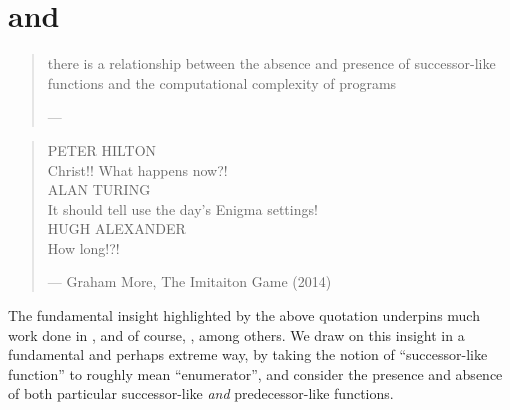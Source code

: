 \chapter{\PTIME{} and \FPTIME{}}

\begin{quotation}

\footnotesize\sffamily\itshape

\begin{flushright}

there is a relationship between the absence and presence of successor-like
functions and the computational complexity of programs

\smallbreak

\upshape

--- \cite{jones-kristiansen-2009}

\end{flushright}

\end{quotation}

\begin{quotation}

\footnotesize\sffamily\itshape

\begin{flushright}

{\upshape PETER HILTON} \\
Christ!! What happens now?!\\
{\upshape ALAN TURING} \\
It should tell use the day's Enigma settings!\\
{\upshape HUGH ALEXANDER} \\
How long!?!

\smallbreak

\upshape

--- Graham More, The Imitaiton Game (2014)

\end{flushright}

\end{quotation}


The fundamental insight highlighted by the above quotation underpins much work
done in \cite{jones-1999, jones-2001, kristiansen-voda-2005, hofmann-2003,
kristiansen-2008}, and of course, \cite{jones-kristiansen-2009}, among others.
We draw on this insight in a fundamental and perhaps extreme way, by taking the
notion of ``successor-like function'' to roughly mean ``enumerator'', and
consider the presence and absence of both particular successor-like \emph{and}
predecessor-like functions.

